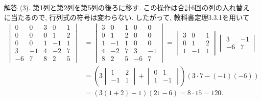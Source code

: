 \documentclass[dvipdfmx,a4paper,11pt]{article} %
\theoremstyle{definition}
\begin{document}
\begin{enumerate}[label=\textbf{問題}\arabic*.]
解答 (3).
第1列と第2列を第5列の後ろに移す.
この操作は合計6回の列の入れ替えに当たるので,
行列式の符号は変わらない. したがって, 教科書定理3.3.1を用いて
\[
\begin{aligned}
\begin{vmatrix}
0&0&3&0&1\\
0&0&0&1&2\\
0&0&1&-1&1\\
3&-1&4&-2&7\\
-6&7&8&2&5
\end{vmatrix}
&=
\begin{vmatrix}
3&0&1&0&0\\
0&1&2&0&0\\
1&-1&1&0&0\\
4&-2&7&3&-1\\
8&2&5&-6&7
\end{vmatrix}
=
\begin{vmatrix}
3&0&1\\
0&1&2\\
1&-1&1
\end{vmatrix}
\begin{vmatrix}
3&-1\\
-6&7
\end{vmatrix}\\
&=
\left(
3
\begin{vmatrix}
1&2\\
-1&1
\end{vmatrix}
+
\begin{vmatrix}
0&1\\
1&-1
\end{vmatrix}
\right)
\left(3\cdot 7-(-1)(-6)\right)\\
&=
\left(3(1+2)-1\right)(21-6)
=
8\cdot 15
=
120.
\end{aligned}
\]



\end{enumerate}
\end{document}
